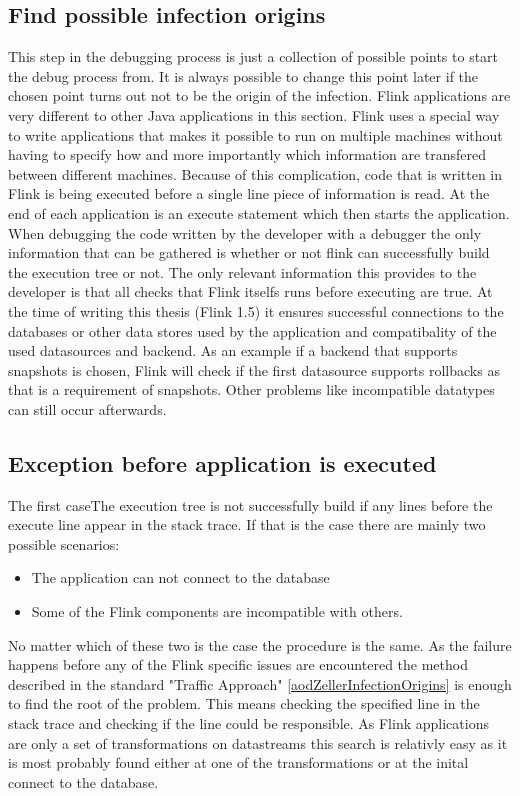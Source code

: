 \subsection{Find possible infection origins}
This step in the debugging process is just a collection of possible points to start the debug process from. It is always possible to change this point later if the chosen point turns out not to be the origin of the infection. Flink applications are very different to other Java applications in this section. Flink uses a special way to write applications that makes it possible to run on multiple machines without having to specify how and more importantly which information are transfered between different machines. Because of this complication, code that is written in Flink is being executed before a single line piece of information is read. At the end of each application is an execute statement which then starts the application. When debugging the code written by the developer with a debugger the only information that can be gathered is whether or not flink can successfully build the execution tree or not. The only relevant information this provides to the developer is that all checks that Flink itselfs runs before executing are true. At the time of writing this thesis (Flink 1.5) it ensures successful connections to the databases or other data stores used by the application and  compatibality of the used datasources and backend. As an example if a backend that supports snapshots is chosen, Flink will check if the first datasource supports rollbacks as that is a requirement of snapshots. Other problems like incompatible datatypes can still occur afterwards.


\subsection{Exception before application is executed}
The first caseThe execution tree is not successfully build if any lines before the execute line appear in the stack trace. If that is the case there are mainly two possible scenarios:

\begin{itemize}
  \item The application can not connect to the database
  \item Some of the Flink components are incompatible with others.
\end{itemize}

No matter which of these two is the case the procedure is the same. As the failure happens before any of the Flink specific issues are encountered the method described in the standard "Traffic Approach" \ref{aodZellerInfectionOrigins} is enough to find the root of the problem. This means checking the specified line in the stack trace and checking if the line could be responsible. As Flink applications are only a set of transformations on datastreams this search is relativly easy as it is most probably found either at one of the transformations or at the inital connect to the database.

